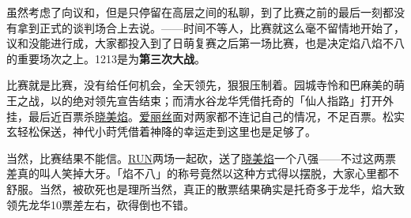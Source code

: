 

虽然考虑了向议和，但是只停留在高层之间的私聊，到了比赛之前的最后一刻都没有拿到正式的谈判场合上去说。——时间不等人，比赛就这么毫不留情地开始了，议和没能进行成，大家都投入到了日萌复赛之后第一场比赛，也是决定焰八焰不八的重要场次之上。1213是为\textbf{第三次大战}。

比赛就是比赛，没有给任何机会，全天领先，狠狠压制着。园城寺怜和巴麻美的萌王之战，以的绝对领先宣告结束；而清水谷龙华凭借托奇的「仙人指路」打开外挂，最后近百票杀\uline{晓美焰}。\uline{爱丽丝}面对两家都不连记自己的情况，不足百票。松实玄轻松保送，神代小莳凭借着神降的幸运走到这里也是足够了。

当然，比赛结果不能信。\uline{RUN}两场一起砍，送了\uline{晓美焰}一个八强——不过这两票差真的叫人笑掉大牙。「焰不八」的称号竟然以这种方式得以摆脱，大家心里都不舒服。当然，被砍死也是理所当然，真正的散票结果确实是托奇多于龙华，焰大致领先龙华10票差左右，砍得倒也不错。

